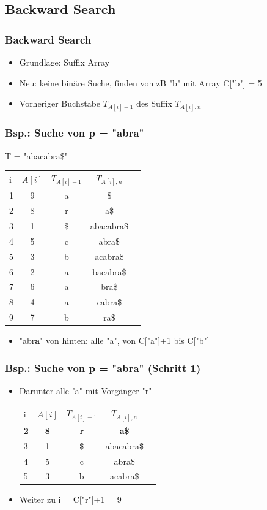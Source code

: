 \documentclass{beamer}
\begin{document}
\subsection{Backward Search}
\begin{frame}
\frametitle{Backward Search}
\begin{itemize}
\item Grundlage: Suffix Array
\item Neu: keine bin\"are Suche, finden von zB "b" mit Array C["b"] = 5
\item Vorheriger Buchstabe $T_{A[i]-1}$ des Suffix $T_{A[i],n}$
\end{itemize}
\end{frame}
\begin{frame}
\frametitle{Bsp.: Suche von p = "abra"}
T = "abacabra\$" \newline
\begin{tabular}{l c cc r}
i & $A[i]$ & $T_{A[i]-1}$ & $T_{A[i],n}$\\
1 & 9 & a & \$ \\
2 & 8 & r & a\$ \\
3 & 1 & \$ & abacabra\$ \\
4 & 5 & c & abra\$ \\
5 & 3 & b & acabra\$ \\
6 & 2 & a & bacabra\$ \\
7 & 6 & a & bra\$ \\
8 & 4 & a & cabra\$ \\
9 & 7 & b & ra\$ \\
\end{tabular}
\begin{itemize}
\item "abr\color{red}\textbf{a}\color{black}" von hinten: alle "a", von C["a"]+1 bis C["b"]
\end{itemize}
\end{frame}
\begin{frame}
\frametitle{Bsp.: Suche von p = "abra" (Schritt 1)}
\begin{itemize}
\item Darunter alle "a" mit Vorg\"anger "r"
\begin{tabular}{l c cc r}
i & $A[i]$ & $T_{A[i]-1}$ & $T_{A[i],n}$\\
\textbf{2} & \textbf{8} & \color{red}\textbf{r} & \textbf{a\$} \\
3 & 1 & \$ & abacabra\$ \\
4 & 5 & c & abra\$ \\
5 & 3 & b & acabra\$ \\
\end{tabular}
\item Weiter zu i = C["r"]+1 = 9
\end{itemize}
\end{frame}
\end{document}
